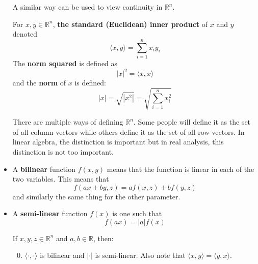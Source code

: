 \begin{itemize}
          A similar way can be used to view continuity in $\mathbb{R}^n.$
          \begin{definition}
              For $x,y\in \mathbb{R}^n$, \textbf{the standard (Euclidean) inner product} of $x$ and $y$ denoted
              \begin{equation}
                  \langle x,y\rangle = \sum_{i=1}^n x_iy_i
              \end{equation}
              The \textbf{norm squared} is defined as
              \begin{equation}
                  |x|^2 = \langle x,x\rangle
              \end{equation}
              and the \textbf{norm} of $x$ is defined:
              \begin{equation}
                  |x| = \sqrt{|x^2|} = \sqrt{\sum_{i=1}^n x_i^2}
              \end{equation}
          \end{definition}
          \begin{idea}
              There are multiple ways of defining $\mathbb{R}^n$. Some people will define it as the set of all column vectors while others define it as the set of all row vectors. In linear algebra, the distinction is important but in real analysis, this distinction is not too important.
          \end{idea}
    \item A \textbf{bilinear} function $f(x,y)$ means that the function is linear in each of the two variables. This means that
          \begin{equation}
              f(ax+by, z) = af(x,z)+bf(y,z)
          \end{equation}
          and similarly the same thing for the other parameter.
    \item A \textbf{semi-linear} function $f(x)$ is one such that
          \begin{equation}
              f(ax)=|a|f(x)
          \end{equation}
          \begin{proposition}
              If $x,y,z \in \mathbb{R}^n$ and $a,b \in \mathbb{R}$, then:
              \begin{enumerate}
                  \setcounter{enumi}{-1}
                  \item $\langle \cdot, \cdot \rangle$ is bilinear and $|\cdot |$ is semi-linear. Also note that $\langle x,y\rangle = \langle y,x\rangle.$


\end{enumerate}
\end{proposition}
\end{itemize}
